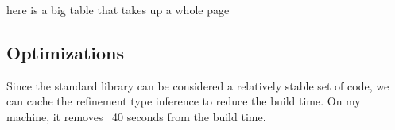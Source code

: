 here is a big table that takes up a whole page

\subsection{Optimizations}

Since the standard library can be considered a relatively stable set of code, we can cache the refinement type inference to reduce the build time.
On my machine, it removes ~40 seconds from the build time.